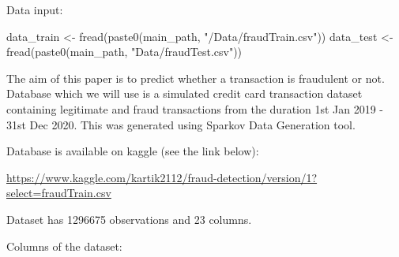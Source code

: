 \documentclass[
]{report}
\newenvironment{Shaded}{\begin{snugshade}}{\end{snugshade}}
\newcommand{\FunctionTok}[1]{\textcolor[rgb]{0.00,0.00,0.00}{#1}}
\newcommand{\NormalTok}[1]{#1}
\newcommand{\OtherTok}[1]{\textcolor[rgb]{0.56,0.35,0.01}{#1}}
\newcommand{\StringTok}[1]{\textcolor[rgb]{0.31,0.60,0.02}{#1}}
\begin{document}
Data input:

\begin{Shaded}
\begin{Highlighting}[]
\NormalTok{data\_train }\OtherTok{\textless{}{-}} \FunctionTok{fread}\NormalTok{(}\FunctionTok{paste0}\NormalTok{(main\_path, }\StringTok{"/Data/fraudTrain.csv"}\NormalTok{))}
\NormalTok{data\_test }\OtherTok{\textless{}{-}} \FunctionTok{fread}\NormalTok{(}\FunctionTok{paste0}\NormalTok{(main\_path, }\StringTok{"Data/fraudTest.csv"}\NormalTok{))}
\end{Highlighting}
\end{Shaded}

The aim of this paper is to predict whether a transaction is fraudulent
or not. Database which we will use is a simulated credit card
transaction dataset containing legitimate and fraud transactions from
the duration 1st Jan 2019 - 31st Dec 2020. This was generated using
Sparkov Data Generation tool.

Database is available on kaggle (see the link below):

\url{https://www.kaggle.com/kartik2112/fraud-detection/version/1?select=fraudTrain.csv}

Dataset has 1296675 observations and 23 columns.

Columns of the dataset:
\end{document}
